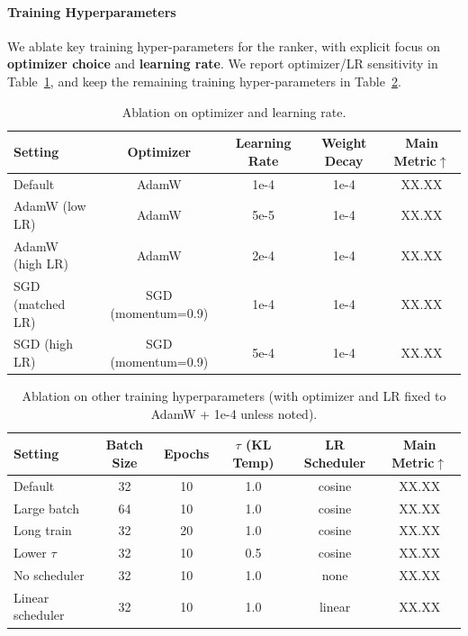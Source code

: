\documentclass{article}
\begin{document}
\paragraph{Training Hyperparameters}
We ablate key training hyper-parameters for the ranker, with explicit focus on \textbf{optimizer choice} and \textbf{learning rate}. We report optimizer/LR sensitivity in Table~\ref{tab:ablation_opt_lr}, and keep the remaining training hyper-parameters in Table~\ref{tab:ablation_hparams}. %

\begin{table}[htbp]
\centering
\caption{Ablation on optimizer and learning rate.}
\label{tab:ablation_opt_lr}
\begin{tabular}{lcccc}
\toprule
Setting & Optimizer & Learning Rate & Weight Decay & Main Metric$\uparrow$ \\
\midrule
Default & AdamW & 1e-4 & 1e-4 & XX.XX \\
AdamW (low LR) & AdamW & 5e-5 & 1e-4 & XX.XX \\
AdamW (high LR) & AdamW & 2e-4 & 1e-4 & XX.XX \\
SGD (matched LR) & SGD (momentum=0.9) & 1e-4 & 1e-4 & XX.XX \\
SGD (high LR) & SGD (momentum=0.9) & 5e-4 & 1e-4 & XX.XX \\
\bottomrule
\end{tabular}
\end{table}

\begin{table}[htbp]
\centering
\caption{Ablation on other training hyperparameters (with optimizer and LR fixed to AdamW + 1e-4 unless noted).}
\label{tab:ablation_hparams}
\begin{tabular}{lccccc}
\toprule
Setting & Batch Size & Epochs & $\tau$ (KL Temp) & LR Scheduler & Main Metric$\uparrow$ \\
\midrule
Default & 32 & 10 & 1.0 & cosine & XX.XX \\
Large batch & 64 & 10 & 1.0 & cosine & XX.XX \\
Long train & 32 & 20 & 1.0 & cosine & XX.XX \\
Lower $\tau$ & 32 & 10 & 0.5 & cosine & XX.XX \\
No scheduler & 32 & 10 & 1.0 & none & XX.XX \\
Linear scheduler & 32 & 10 & 1.0 & linear & XX.XX \\
\bottomrule
\end{tabular}
\end{table}
\end{document}
